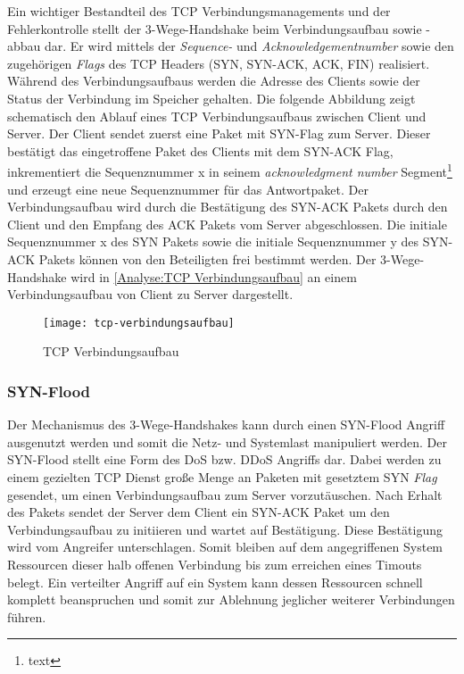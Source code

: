 Ein wichtiger Bestandteil des \ac{TCP} Verbindungsmanagements und der Fehlerkontrolle stellt der 3-Wege-Handshake beim Verbindungsaufbau sowie -abbau dar. Er wird mittels der \textit{Sequence-} und \textit{Acknowledgementnumber} sowie den zugehörigen \textit{Flags} des \ac{TCP} Headers (\ac{SYN}, \ac{SYN-ACK}, \ac{ACK}, \ac{FIN}) realisiert. Während des Verbindungsaufbaus werden die Adresse des Clients sowie der Status der Verbindung im Speicher gehalten. Die folgende Abbildung zeigt schematisch den Ablauf eines \ac{TCP} Verbindungsaufbaus zwischen Client und Server. Der Client sendet zuerst eine Paket mit SYN-Flag zum Server. Dieser bestätigt das eingetroffene Paket des Clients mit dem SYN-ACK Flag, inkrementiert die Sequenznummer x in seinem \textit{acknowledgment number} Segment\footnote{text} und erzeugt eine neue Sequenznummer für das Antwortpaket. Der Verbindungsaufbau wird durch die Bestätigung des SYN-ACK Pakets durch den Client und den Empfang des ACK Pakets vom Server abgeschlossen. Die initiale Sequenznummer x des SYN Pakets sowie die initiale Sequenznummer y des SYN-ACK Pakets können von den Beteiligten frei bestimmt werden. Der 3-Wege-Handshake wird in \autoref{Analyse:TCP Verbindungsaufbau} an einem Verbindungsaufbau von Client zu Server dargestellt.

\begin{figure}[h]
    \centering
    \texttt{[image: tcp-verbindungsaufbau]}
    \caption{TCP Verbindungsaufbau}
    \label{Analyse:TCP Verbindungsaufbau}
  \end{figure}
  
\clearpage

\subsubsection{SYN-Flood}
Der Mechanismus des 3-Wege-Handshakes kann durch einen SYN-Flood Angriff ausgenutzt werden und somit die Netz- und Systemlast manipuliert werden. Der SYN-Flood stellt eine Form des \ac{DoS} bzw. \ac{DDoS} Angriffs dar. Dabei werden zu einem gezielten \ac{TCP} Dienst große Menge an Paketen mit gesetztem SYN \textit{Flag} gesendet, um einen Verbindungsaufbau zum Server vorzutäuschen. Nach Erhalt des Pakets sendet der Server dem Client ein SYN-ACK Paket um den Verbindungsaufbau zu initiieren und wartet auf Bestätigung. Diese Bestätigung wird vom Angreifer unterschlagen. Somit bleiben auf dem angegriffenen System Ressourcen dieser halb offenen Verbindung bis zum erreichen eines Timouts belegt. Ein verteilter Angriff auf ein System kann dessen Ressourcen schnell komplett beanspruchen und somit zur Ablehnung jeglicher weiterer Verbindungen führen.


